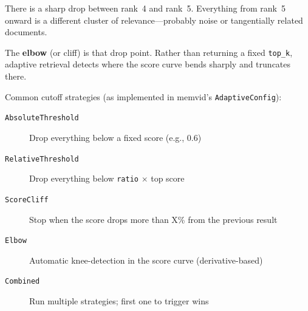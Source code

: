 There is a sharp drop between rank~4 and rank~5. Everything from rank~5 onward is a different
cluster of relevance---probably noise or tangentially related documents.

The \textbf{elbow} (or cliff) is that drop point. Rather than returning a fixed \texttt{top\_k},
adaptive retrieval detects where the score curve bends sharply and truncates there.

Common cutoff strategies (as implemented in memvid's \texttt{AdaptiveConfig}):

\begin{description}
    \item[\texttt{AbsoluteThreshold}] Drop everything below a fixed score (e.g., 0.6)
    \item[\texttt{RelativeThreshold}] Drop everything below \texttt{ratio} $\times$ top score
    \item[\texttt{ScoreCliff}] Stop when the score drops more than X\% from the previous result
    \item[\texttt{Elbow}] Automatic knee-detection in the score curve (derivative-based)
    \item[\texttt{Combined}] Run multiple strategies; first one to trigger wins
\end{description}
